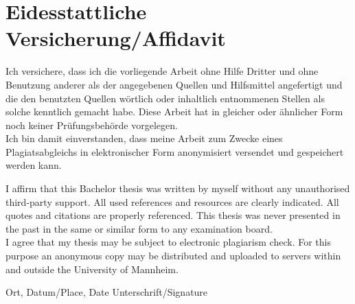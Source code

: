 \documentclass[a4paper,12pt]{scrartcl} %
\begin{document}
\section{Eidesstattliche Versicherung/Affidavit}

Ich versichere, dass ich die vorliegende Arbeit ohne Hilfe Dritter und ohne Benutzung anderer
als der angegebenen Quellen und Hilfsmittel angefertigt und die den benutzten Quellen
wörtlich oder inhaltlich entnommenen Stellen als solche kenntlich gemacht habe. Diese Arbeit
hat in gleicher oder ähnlicher Form noch keiner Prüfungsbehörde vorgelegen.\\
Ich bin damit einverstanden, dass meine Arbeit zum Zwecke eines Plagiatsabgleichs in
elektronischer Form anonymisiert versendet und gespeichert werden kann.\\

\vspace{1cm}

I affirm that this Bachelor thesis was written by myself without any unauthorised third-party
support. All used references and resources are clearly indicated. All quotes and citations are
properly referenced. This thesis was never presented in the past in the same or similar form to
any examination board.\\
I agree that my thesis may be subject to electronic plagiarism check. For this purpose an
anonymous copy may be distributed and uploaded to servers within and outside the University
of Mannheim.

\vspace{3cm}
\makebox[\textwidth]{\hrulefill \hspace{3cm} \hrulefill}

Ort, Datum/Place, Date \hfill Unterschrift/Signature
\end{document}
